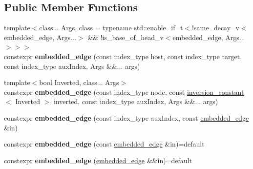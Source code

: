 \subsection*{Public Member Functions}
\begin{DoxyCompactItemize}
\item 
\mbox{\label{classsequoia_1_1maths_1_1embedded__edge_a13d5d1abd84d8ca56a58976e04b8959a}} 
{\footnotesize template$<$class... Args, class  = typename std\+::enable\+\_\+if\+\_\+t$<$!same\+\_\+decay\+\_\+v$<$embedded\+\_\+edge, Args...$>$ \&\& !is\+\_\+base\+\_\+of\+\_\+head\+\_\+v$<$embedded\+\_\+edge, Args...$>$$>$$>$ }\\constexpr {\bfseries embedded\+\_\+edge} (const index\+\_\+type host, const index\+\_\+type target, const index\+\_\+type aux\+Index, Args \&\&... args)
\item 
\mbox{\label{classsequoia_1_1maths_1_1embedded__edge_ac85831ca46a9b163fe7ee3427fec16b1}} 
{\footnotesize template$<$bool Inverted, class... Args$>$ }\\constexpr {\bfseries embedded\+\_\+edge} (const index\+\_\+type node, const \mbox{\hyperlink{structsequoia_1_1maths_1_1inversion__constant}{inversion\+\_\+constant}}$<$ Inverted $>$ inverted, const index\+\_\+type aux\+Index, Args \&\&... args)
\item 
\mbox{\label{classsequoia_1_1maths_1_1embedded__edge_a2d9d6976eac0bc01d6af9093a279b091}} 
constexpr {\bfseries embedded\+\_\+edge} (const index\+\_\+type aux\+Index, const \mbox{\hyperlink{classsequoia_1_1maths_1_1embedded__edge}{embedded\+\_\+edge}} \&in)
\item 
\mbox{\label{classsequoia_1_1maths_1_1embedded__edge_a3126279015c6f933df9e373a5aac5926}} 
constexpr {\bfseries embedded\+\_\+edge} (const \mbox{\hyperlink{classsequoia_1_1maths_1_1embedded__edge}{embedded\+\_\+edge}} \&in)=default
\item 
\mbox{\label{classsequoia_1_1maths_1_1embedded__edge_add6f0a50a75ef9299d0f7deb7f439e4a}} 
constexpr {\bfseries embedded\+\_\+edge} (\mbox{\hyperlink{classsequoia_1_1maths_1_1embedded__edge}{embedded\+\_\+edge}} \&\&in)=default

\end{DoxyCompactItemize}
